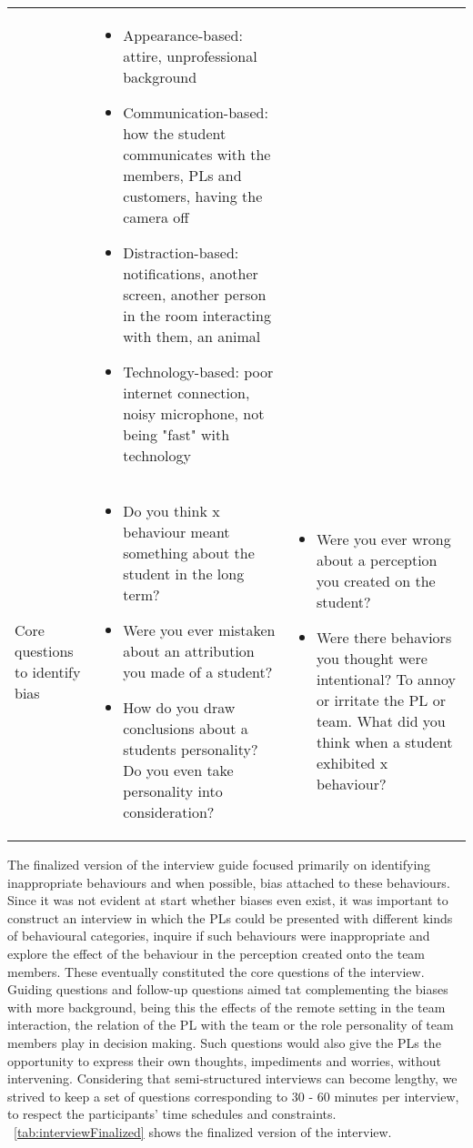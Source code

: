 \begin{longtable}{ p{} p{}   p{} }
	& 
	 \begin{itemize}[leftmargin=*,topsep=0pt]
      \item Appearance-based: attire, unprofessional background
    \item  Communication-based: how the student communicates with the members, PLs and customers, having the camera off
    \item Distraction-based: notifications, another screen, another person in the room interacting with them, an animal
    \item Technology-based: poor internet connection, noisy microphone, not being "fast" with technology
    \end{itemize}
    \\
     Core questions to identify bias
     & 
      \begin{itemize}[leftmargin=*,topsep=0pt]
      \item Do you think x behaviour meant something about the student in the long term?
    \item  Were you ever mistaken about an attribution you made of a student?
    \item  How do you draw conclusions about a students personality? Do you even take personality into consideration?
    \end{itemize}

      & 
      \begin{itemize}[leftmargin=*,topsep=0pt]
      \item Were you ever wrong about a perception you created on the student? 
    \item Were there behaviors you thought were intentional? To annoy or irritate the PL or team. What did you think when a student exhibited x behaviour?
    \end{itemize}
    \\
    \bottomrule
\end{longtable}

The finalized version of the interview guide focused primarily on identifying inappropriate behaviours and when possible, bias attached to these behaviours. Since it was not evident at start whether biases even exist, it was important to construct an interview in which the PLs could be presented with different kinds of behavioural categories, inquire if such behaviours were inappropriate and explore the effect of the behaviour in the perception created onto the team members. These eventually constituted the core questions of the interview. Guiding questions and follow-up questions aimed tat complementing the biases with more background, being this the effects of the remote setting in the team interaction, the relation of the PL with the team or the role personality of team members play in decision making. Such questions would also give the PLs the opportunity to express their own thoughts, impediments and worries, without intervening. Considering that semi-structured interviews can become lengthy, we strived to keep a set of questions corresponding to 30 - 60 minutes per interview, to respect the participants' time schedules and constraints.  ~\autoref{tab:interviewFinalized} shows the finalized version of the interview.

